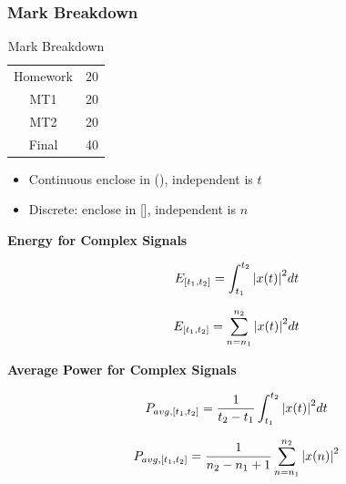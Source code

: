 \documentclass[10pt]{article}
\begin{document}
\subsubsection{Mark Breakdown}

\begin{table}[H]
	\centering
	\caption{Mark Breakdown}
	\begin{tabular}{|c|c|}
		\hline
		Homework & 20 \\
		MT1 & 20 \\
		MT2 & 20 \\
		Final & 40 \\
		\hline
	\end{tabular}
\end{table}


\begin{itemize}
	\item Continuous enclose in (), independent is $ t $ 
	\item Discrete: enclose in [], independent is $ n $ 
\end{itemize}



\begin{theorem}
	\textbf{Energy for Complex Signals} 

	\begin{equation}
		E_{[t_1, t_2]} = \int_{t_1}^{t_2} \abs{x(t)}^2 dt
		\label{eq:355:energy_CT}
	\end{equation}

	\begin{equation}
		E_{[t_1, t_2]} = \sum_{n=n_1}^{n_2} \abs{x(t)}^2 dt
		\label{eq:355:energy_DT}
	\end{equation}

	\textbf{Average Power for Complex Signals} 

	\begin{equation}
		P_{avg, [t_1, t_2]} = \frac{1}{t_2 - t_1} \int_{t_1}^{t_2} \abs{x(t)}^2 dt
		\label{eq:355:power_avg_CT}
	\end{equation}

	\begin{equation}
		P_{avg, [t_1, t_2]} = \frac{1}{n_2 - n_1 + 1} \sum_{n=n_1}^{n_2} \abs{x(n)}^2
		\label{eq:355:power_avg_DT}
	\end{equation}
		
\end{theorem}
\end{document}
